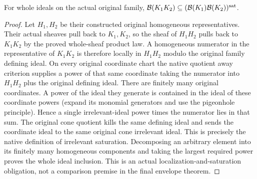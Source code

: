 \begin{lemma}
\label{lem:c0n-scheme-cone-saturation-product}
\leanok
{}
For whole ideals on the actual original family,
$\mathcal B(K_1K_2)\subseteq(\mathcal B(K_1)\mathcal B(K_2))^{\rm sat}$.
\end{lemma}
\begin{proof}
Let $H_1,H_2$ be their constructed original homogeneous representatives. Their
actual sheaves pull back to $K_1,K_2$, so the sheaf of $H_1H_2$ pulls back to
$K_1K_2$ by the proved whole-sheaf product law. A homogeneous numerator in the
representative of $K_1K_2$ is therefore locally in $H_1H_2$ modulo the original
family defining ideal. On every original coordinate chart the native quotient
away criterion supplies a power of that same coordinate taking the numerator
into $H_1H_2$ plus the original defining ideal. There are finitely many original
coordinates. A power of the ideal they generate is contained in the ideal of
these coordinate powers (expand its monomial generators and use the
pigeonhole principle). Hence a single irrelevant-ideal power times the
numerator lies in that sum. The original cone quotient kills the same defining
ideal and sends the coordinate ideal to the same original cone irrelevant
ideal. This is precisely the native definition of irrelevant saturation.
Decomposing an arbitrary element into its finitely many homogeneous
components and taking the largest required power proves the whole ideal
inclusion. This is an actual localization-and-saturation obligation, not a
comparison premise in the final envelope theorem.
\end{proof}

